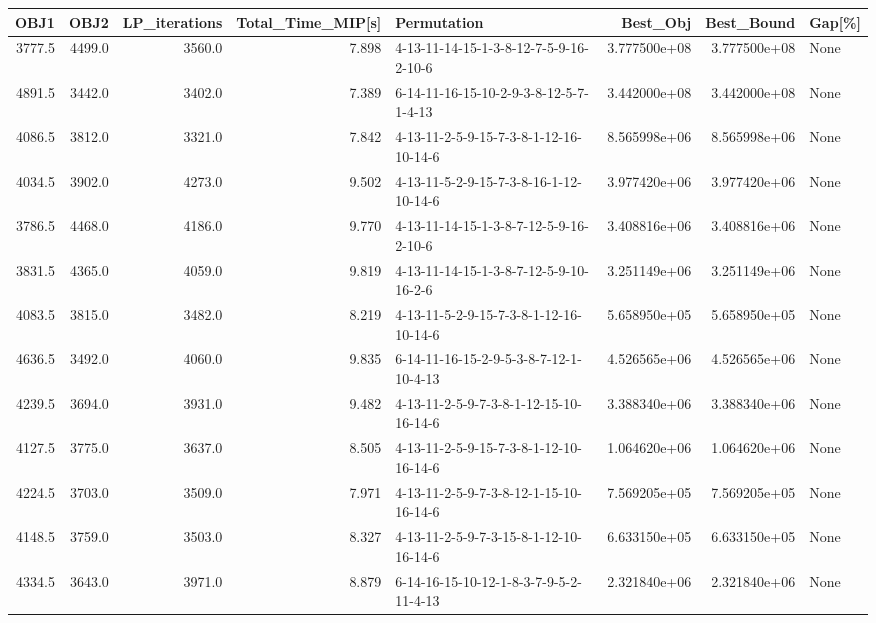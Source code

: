 \begin{tabular}{rrrrlrrl}
\toprule
   OBJ1 &    OBJ2 &  LP\_iterations &  Total\_Time\_MIP[s] &                             Permutation &      Best\_Obj &    Best\_Bound & Gap[\%] \\
\midrule
 3777.5 &  4499.0 &         3560.0 &              7.898 &  4-13-11-14-15-1-3-8-12-7-5-9-16-2-10-6 &  3.777500e+08 &  3.777500e+08 &   None \\
 4891.5 &  3442.0 &         3402.0 &              7.389 &  6-14-11-16-15-10-2-9-3-8-12-5-7-1-4-13 &  3.442000e+08 &  3.442000e+08 &   None \\
 4086.5 &  3812.0 &         3321.0 &              7.842 &  4-13-11-2-5-9-15-7-3-8-1-12-16-10-14-6 &  8.565998e+06 &  8.565998e+06 &   None \\
 4034.5 &  3902.0 &         4273.0 &              9.502 &  4-13-11-5-2-9-15-7-3-8-16-1-12-10-14-6 &  3.977420e+06 &  3.977420e+06 &   None \\
 3786.5 &  4468.0 &         4186.0 &              9.770 &  4-13-11-14-15-1-3-8-7-12-5-9-16-2-10-6 &  3.408816e+06 &  3.408816e+06 &   None \\
 3831.5 &  4365.0 &         4059.0 &              9.819 &  4-13-11-14-15-1-3-8-7-12-5-9-10-16-2-6 &  3.251149e+06 &  3.251149e+06 &   None \\
 4083.5 &  3815.0 &         3482.0 &              8.219 &  4-13-11-5-2-9-15-7-3-8-1-12-16-10-14-6 &  5.658950e+05 &  5.658950e+05 &   None \\
 4636.5 &  3492.0 &         4060.0 &              9.835 &  6-14-11-16-15-2-9-5-3-8-7-12-1-10-4-13 &  4.526565e+06 &  4.526565e+06 &   None \\
 4239.5 &  3694.0 &         3931.0 &              9.482 &  4-13-11-2-5-9-7-3-8-1-12-15-10-16-14-6 &  3.388340e+06 &  3.388340e+06 &   None \\
 4127.5 &  3775.0 &         3637.0 &              8.505 &  4-13-11-2-5-9-15-7-3-8-1-12-10-16-14-6 &  1.064620e+06 &  1.064620e+06 &   None \\
 4224.5 &  3703.0 &         3509.0 &              7.971 &  4-13-11-2-5-9-7-3-8-12-1-15-10-16-14-6 &  7.569205e+05 &  7.569205e+05 &   None \\
 4148.5 &  3759.0 &         3503.0 &              8.327 &  4-13-11-2-5-9-7-3-15-8-1-12-10-16-14-6 &  6.633150e+05 &  6.633150e+05 &   None \\
 4334.5 &  3643.0 &         3971.0 &              8.879 &  6-14-16-15-10-12-1-8-3-7-9-5-2-11-4-13 &  2.321840e+06 &  2.321840e+06 &   None \\

\end{tabular}
